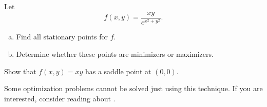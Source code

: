                         \begin{exercise}
                        Let
                        \[
                        f(x,y) = \frac{xy}{e^{x^2+y^2}}.
                        \]
                        \begin{enumerate}[(a)]
                            \item Find all stationary points for $f$.
                            \item Determine whether these points are minimizers or maximizers.
                        \end{enumerate}
                        \end{exercise}
                        
                        \begin{exercise}
                        Show that $f(x,y)=xy$ has a saddle point at $(0,0)$.
                        \end{exercise}
                        
                        Some optimization problems cannot be solved just using this technique.  If you are interested, consider reading about .
                        
